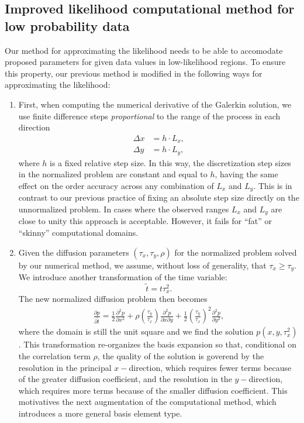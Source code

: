 \documentclass[10pt]{article}
\begin{document}
\subsection{Improved likelihood computational method for low
  probability data} \label{sec:improvements} Our method for
approximating the likelihood needs to be able to accomodate proposed
parameters for given data values in low-likelihood regions. To ensure
this property, our previous method is modified in the following ways
for approximating the likelihood:
\begin{enumerate}
\item First, when computing the numerical derivative of the Galerkin
  solution, we use finite difference steps \textit{proportional} to
  the range of the process in each direction
  \begin{align}
    \Delta x &= h \cdot L_x, \\
    \Delta y &= h \cdot L_y,
  \end{align}
  where $h$ is a fixed relative step size. In this way, the
  discretization step sizes in the normalized problem are constant and
  equal to $h$, having the same effect on the order accuracy across
  any combination of $L_x$ and $L_y$. This is in contrast to our
  previous practice of fixing an absolute step size directly on the
  unnormalized problem. In cases where the observed ranges $L_x$ and
  $L_y$ are close to unity this approach is acceptable. However, it
  fails for ``fat'' or ``skinny'' computational domains.

\item Given the diffusion parameters $(\tau_x, \tau_y, \rho)$ for the
  normalized problem solved by our numerical method, we assume,
  without loss of generality, that $\tau_x \geq \tau_y$. We introduce
  another transformation of the time variable:
  \[ \tilde{t} = t\tau_x^2.\]
  The new normalized diffusion problem then becomes
  \begin{align}
    \frac{\partial p}{\partial \tilde{t}} = \frac{1}{2}
    \frac{\partial^2 p}{\partial x^2} + \rho
    \left(\frac{\tau_y}{\tau_x}\right)\frac{\partial^2 p}{\partial
      x\partial y} + \frac{1}{2}\left(\frac{\tau_y}{\tau_x}\right)^2
    \frac{\partial^2 p}{\partial y^2}, \label{eq:new-normalized}
  \end{align}
  where the domain is still the unit square and we find the solution
  $p(x,y,\tau_x^2)$. This transformation re-organizes the basis
  expansion so that, conditional on the correlation term $\rho$, the
  quality of the solution is goverend by the resolution in the
  principal $x-$direction, which requires fewer terms because of the
  greater diffusion coefficient, and the resolution in the
  $y-$direction, which requires more terms because of the smaller
  diffusion coefficient. This motivatives the next augmentation of the
  computational method, which introduces a more general basis element
  type.


\end{enumerate}
\end{document}

